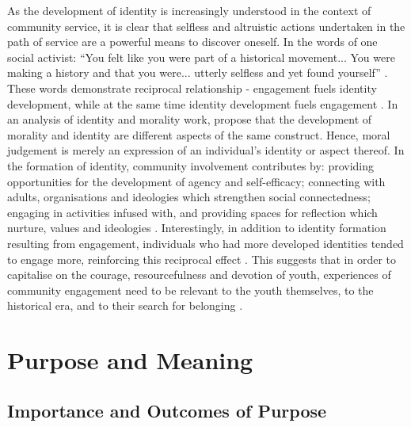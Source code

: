 As the development of identity is increasingly understood in the context of community service, it is clear that selfless and altruistic actions undertaken in the path of service are a powerful means to discover oneself. In the words of one social activist: “You felt like you were part of a historical movement... You were making a history and that you were... utterly selfless and yet found yourself” \citep[][p138]{McAdam1990}. These words demonstrate reciprocal relationship - engagement fuels identity development, while at the same time identity development fuels engagement \citep{Hardy2011}. In an analysis of identity and morality work, \citet{Davidson1991} propose that the development of morality and identity are different aspects of the same construct. Hence, moral judgement is merely an expression of an individual's identity or aspect thereof. In the formation of identity, community involvement contributes by: providing opportunities for the development of agency and self-efficacy; connecting with adults, organisations and ideologies which strengthen social connectedness; engaging in activities infused with, and providing spaces for reflection which nurture, values and ideologies \citep[][see also \citealt{Yates1996a}]{Hardy2011}. Interestingly, in addition to identity formation resulting from engagement, individuals who had more developed identities tended to engage more, reinforcing this reciprocal effect \citep{Hardy2011}. This suggests that in order to capitalise on the courage, resourcefulness and devotion of youth, experiences of community engagement need to be relevant to the youth themselves, to the historical era, and to their search for belonging \citep{Juhasz1982}. 






\section{Purpose and Meaning}

\subsection{Importance and Outcomes of Purpose}

